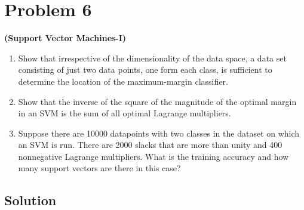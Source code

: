 \section*{Problem 6}

\textbf{(Support Vector Machines-I)}\\
\begin{enumerate}[label= (\alph*), noitemsep, topsep=0pt]
    \item Show that irrespective of the dimensionality of the data space, a data set consisting of just two data points, one form each class, is sufficient to determine the location of the maximum-margin classifier.

    \item Show that the inverse of the square of the magnitude of the optimal margin in an SVM is the sum of all optimal Lagrange multipliers.

    \item Suppose there are 10000 datapoints with two classes in the dataset on which an SVM is run. There are 2000 slacks that are more than unity and 400 nonnegative Lagrange multipliers. What is the training accuracy and how many support vectors are there in this case?
\end{enumerate}

\subsection*{Solution}
